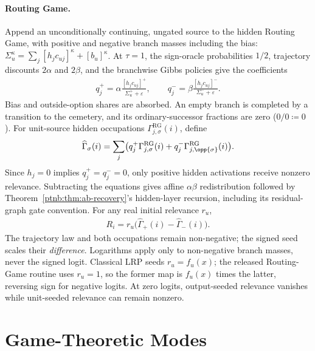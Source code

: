 \paragraph{Routing Game.}
Append an unconditionally continuing, ungated source to the hidden Routing Game, with positive and negative
branch masses including the bias:
$\Sigma_u^\kappa=\sum_j[h_jc_{uj}]^\kappa+[b_u]^\kappa$.
At $\tau=1$, the sign-oracle probabilities $1/2$, trajectory discounts $2\alpha$ and $2\beta$,
and the branchwise Gibbs policies give the coefficients
\begin{align}\label{ptnb:eq:affine-readout-routing}
    q_j^+=\alpha\frac{[h_jc_{uj}]^+}{\Sigma_u^++\varepsilon},
    \qquad q_j^-=\beta\frac{[h_jc_{uj}]^-}{\Sigma_u^-+\varepsilon}.
\end{align}
Bias and outside-option shares are absorbed. An empty branch is completed by a transition to
the cemetery, and its ordinary-successor fractions are zero ($0/0\coloneqq0$).
For unit-source hidden occupations $\Gamma^{\mathrm{RG}}_{j,\sigma}(i)$, define
\begin{align}\label{ptnb:eq:affine-readout-occupation}
    \widehat\Gamma_\sigma(i)=\sum_j\bigl(
    q_j^+\Gamma^{\mathrm{RG}}_{j,\sigma}(i)
    +q_j^-\Gamma^{\mathrm{RG}}_{j,\opp{\sigma}}(i)\bigr).
\end{align}
Since $h_j=0$ implies $q_j^+=q_j^-=0$, only positive hidden activations receive nonzero relevance.
Subtracting the equations gives affine $\alpha\beta$ redistribution followed by
Theorem~\ref{ptnb:thm:ab-recovery}'s hidden-layer recursion, including its residual-graph gate convention. For any real initial relevance $r_u$,
\begin{align}\label{ptnb:eq:affine-readout-relevance}
    R_i=r_u\bigl(\widehat\Gamma_+(i)-\widehat\Gamma_-(i)\bigr).
\end{align}
The trajectory law and both occupations remain non-negative; the signed seed scales their
\emph{difference}. Logarithms apply only to non-negative branch masses, never the signed logit.
Classical LRP seeds $r_u=f_u(x)$; the released Routing-Game routine uses $r_u=1$, so the former map
is $f_u(x)$ times the latter, reversing sign for negative logits. At zero logits, output-seeded
relevance vanishes while unit-seeded relevance can remain nonzero.

\section{Game-Theoretic Modes}\label{ptnb:sec:modes}\label{sec:risk_aversion_regularization}\label{ptnb:sec:controls}\label{ptnb:app:modes}

